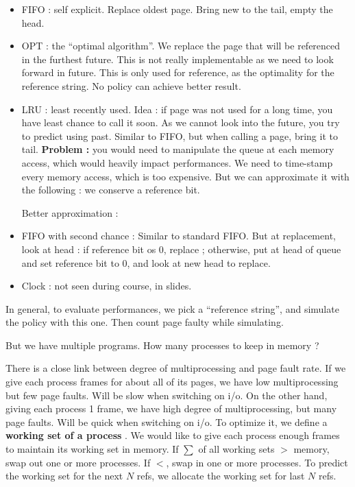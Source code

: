 \documentclass[12pt,a4paper]{article}
\begin{document}
\begin{itemize}
    \item FIFO : self explicit. Replace oldest page. Bring new to the tail, empty the head.
    \item OPT : the ``optimal algorithm''. We replace the page that will be referenced in the furthest future. This is not really implementable as we need to look forward in future. This is only used for reference, as the optimality for the reference string. No policy can achieve better result. 
    \item LRU : least recently used. Idea : if page was not used for a long time, you have least chance to call it soon. As we cannot look into the future, you try to predict using past. Similar to FIFO, but when calling a page, bring it to tail. \textbf{Problem :} you would need to manipulate the queue at each memory access, which would heavily impact performances. We need to time-stamp every memory access, which is too expensive. But we can approximate it with the following : we conserve a reference bit. 
    
    Better approximation : 
    \item FIFO with second chance : Similar to standard FIFO. But at replacement, look at head : if reference bit os 0, replace ; otherwise, put at head of queue and set reference bit to 0, and look at new head to replace. 
    \item Clock : not seen during course, in slides.
\end{itemize}
In general, to evaluate performances, we pick a ``reference string'', and simulate the policy with this one. Then count page faulty while simulating.

But we have multiple programs. How many processes to keep in memory ? 

There is a close link between degree of multiprocessing and page fault rate. If we give each process frames for about all of its pages, we have low multiprocessing but few page faults. Will be slow when switching on i/o. On the other hand, giving each process 1 frame, we have high degree of multiprocessing, but many page faults. Will be quick when switching on i/o. To optimize it, we define a \textbf{working set of a process} . We would like to give each process enough frames to maintain its working set in memory. If $\sum$ of all working sets $>$ memory, swap out one or more processes. If $<$, swap in one or more processes. To predict the working set for the next $N$ refs, we allocate the working set for last $N$ refs. 
\end{document}
